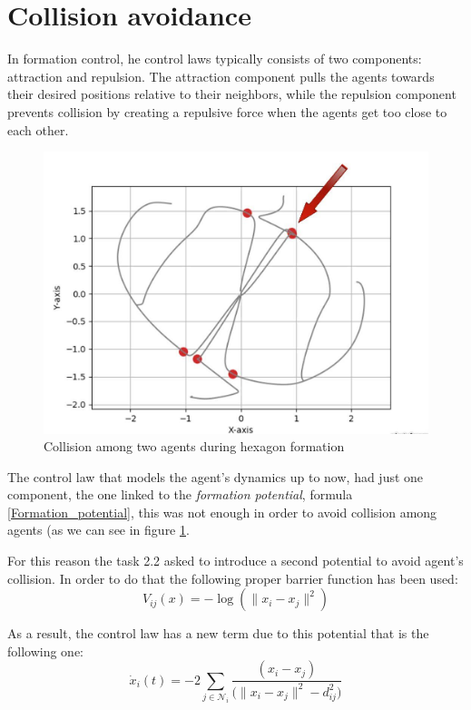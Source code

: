 \documentclass[a4paper,11pt,oneside]{book}
\begin{document}
\section{Collision avoidance}
In formation control, he control laws typically consists of two components: attraction and repulsion. The attraction component pulls the agents towards their desired positions relative to their neighbors, while the repulsion component prevents collision by creating a repulsive force when the agents get too close to each other.

\begin{figure}[h]
\centering
	\includegraphics[scale=0.25]{Collision}
	\caption{Collision among two agents during hexagon formation}
	\label{Collision}
\end{figure}

The control law that models the agent's dynamics up to now, had just one component, the one linked to the \textit{formation potential}, formula \ref{Formation_potential}, this was not enough in order to avoid collision among agents (as we can see in figure \ref{Collision}. 

\bigskip
For this reason the task 2.2 asked to introduce a second potential to avoid agent's collision. In order to do that the following proper barrier function has been used:
\begin{equation}
V_{ij}(x) = - \log( \lVert x_i - x_j \rVert ^2)
\label{Collision_barrier}
\end{equation}


As a result, the control law has a new term due to this potential that is the following one:
\begin{equation}
\dot{x}_i(t) = - 2\sum_{j \in \mathcal{N}_i} \frac{(x_i-x_j)}{\bigg( \lVert x_i - x_j \rVert^2 - d_{ij}^2 \bigg)}
\end{equation}
\end{document}
